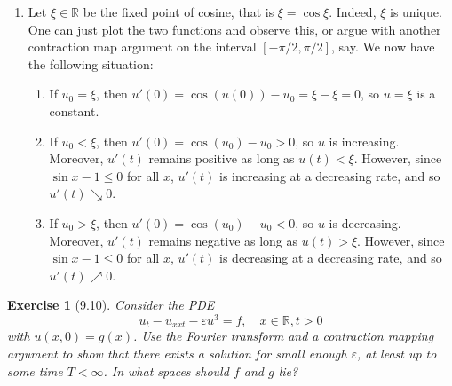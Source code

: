 \documentclass[letterpaper,twoside,11pt]{article}
\theoremstyle{mystyle}
\newtheorem*{exercise}{Exercise}
\newcommand{\R}{{\mathbb R}}
\newcommand{\cbk}{\color{black}}
\begin{document}
\begin{enumerate}
  \item Let $\xi \in \R$ be the fixed point of cosine, that is $\xi = \cos\xi$. Indeed, $\xi$ is unique. One can just plot the two functions and observe this, or argue with another contraction map argument on the interval $[-\pi/2, \pi/2]$, say. We now have the following situation: 
  \begin{enumerate}
    \item If $u_0 = \xi$, then $u'(0) = \cos(u(0)) - u_0 = \xi - \xi = 0$, so $u = \xi$ is a constant. 
    \item If $u_0 < \xi$, then $u'\left( 0 \right) = \cos \left( {{u_0}} \right) - {u_0} > 0$, so $u$ is increasing. Moreover, $u'(t)$ remains positive as long as $u(t) < \xi$. However, since $\sin x - 1 \leq 0$ for all $x$, $u'(t)$ is increasing at a decreasing rate, and so $u'(t) \searrow 0$. 
    \item If $u_0 > \xi$, then $u'\left( 0 \right) = \cos \left( {{u_0}} \right) - {u_0} < 0$, so $u$ is decreasing. Moreover, $u'(t)$ remains negative as long as $u(t) > \xi$. However, since $\sin x - 1 \leq 0$ for all $x$, $u'(t)$ is decreasing at a decreasing rate, and so $u'(t) \nearrow 0$. 
  \end{enumerate}
\end{enumerate}

\cbk 

\begin{exercise}[9.10]
  Consider the PDE 
  \[u_{t} - u_{xxt} - \varepsilon u^3 = f, \quad x\in \R, t>0 \]
  with $u(x,0) = g(x)$. Use the Fourier transform and a contraction mapping argument to show that there exists a solution for small enough $\varepsilon$, at least up to some time $T< \infty$. In what spaces should $f$ and $g$ lie? 
\end{exercise}
\end{document}
